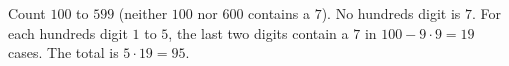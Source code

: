 Count $100$ to $599$ (neither $100$ nor $600$ contains a $7$). No hundreds digit is $7$. For each hundreds digit $1$ to $5$, the last two digits contain a $7$ in $100-9\cdot9=19$ cases. The total is $5\cdot19=\boxed{95}$.
